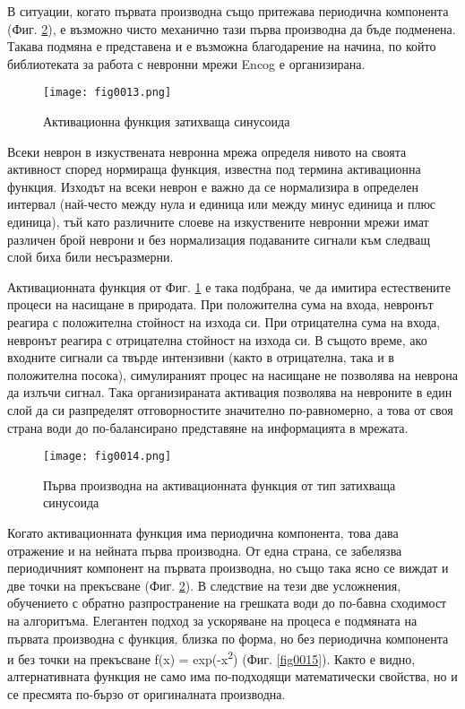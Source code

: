В ситуации, когато първата производна също притежава периодична компонента (Фиг. \ref{fig0014}), е възможно чисто механично тази първа производна да бъде подменена. Такава подмяна е представена и е възможна благодарение на начина, по който библиотеката за работа с невронни мрежи Encog е организирана.

\begin{figure}[H]
  \centering
  \texttt{[image: fig0013.png]}
  \caption{Активационна функция затихваща синусоида}
\label{fig0013}
\end{figure}

Всеки неврон в изкуствената невронна мрежа определя нивото на своята активност според нормираща функция, известна под термина активационна функция. Изходът на всеки неврон е важно да се нормализира в определен интервал (най-често между нула и единица или между минус единица и плюс единица), тъй като различните слоеве на изкуствените невронни мрежи имат различен брой неврони и без нормализация подаваните сигнали към следващ слой биха били несъразмерни.

Активационната функция от Фиг. \ref{fig0013} е така подбрана, че да имитира естествените процеси на насищане в природата. При положителна сума на входа, невронът реагира с положителна стойност на изхода си. При отрицателна сума на входа, невронът реагира с отрицателна стойност на изхода си. В същото време, ако входните сигнали са твърде интензивни (както в отрицателна, така и в положителна посока), симулираният процес на насищане не позволява на неврона да излъчи сигнал. Така организираната активация позволява на невроните в един слой да си разпределят отговорностите значително по-равномерно, а това от своя страна води до по-балансирано представяне на информацията в мрежата.

\begin{figure}[H]
  \centering
  \texttt{[image: fig0014.png]}
  \caption{Първа производна на активационната функция от тип затихваща синусоида}
\label{fig0014}
\end{figure}

Когато активационната функция има периодична компонента, това дава отражение и на нейната първа производна. От една страна, се забелязва периодичният компонент на първата производна, но също така ясно се виждат и две точки на прекъсване (Фиг. \ref{fig0014}). В следствие на тези две усложнения, обучението с обратно разпространение на грешката води до по-бавна сходимост на алгоритъма. Елегантен подход за ускоряване на процеса е подмяната на първата производна с функция, близка по форма, но без периодична компонента и без точки на прекъсване f(x) = exp(-x\textsuperscript{2}) (Фиг. \ref{fig0015}). Както е видно, алтернативната функция не само има по-подходящи математически свойства, но и се пресмята по-бързо от оригиналната производна.

